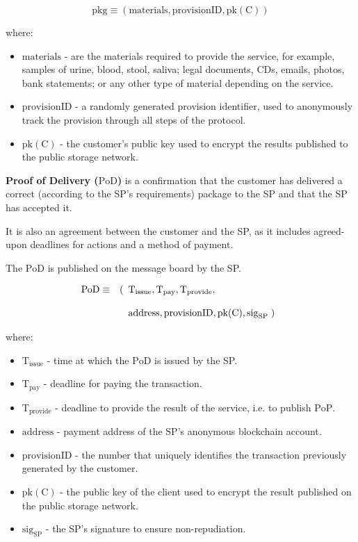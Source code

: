 \documentclass[pdftex,twocolumn,epjc3]{svjour3}
\begin{document}
{$$\mathrm{pkg} \equiv (\mathrm{materials}, \mathrm{provisionID}, \mathrm{pk(C)})$$

where:

\begin{itemize}

\item $\mathrm{materials}$ - are the materials required to provide the service, for example, samples of urine, blood, stool, saliva; legal documents, CDs, emails, photos, bank statements; or any other type of material depending on the service.
\item $\mathrm{provisionID}$ - a randomly generated provision identifier, used to anonymously track the provision through all steps of the protocol.
\item $\mathrm{pk(C)}$ - the customer's public key used to encrypt the results published to the public storage network.
\end{itemize}

\noindent \textbf
{Proof of Delivery ($\mathrm{PoD}$)}\label{proof-of-delivery} is a confirmation that the customer has delivered a correct (according to the SP's requirements) package to the SP and that the SP has accepted it.

It is also an agreement between the customer and the SP, as it includes agreed-upon deadlines for actions and a method of payment.

The $\mathrm{PoD}$ is published on the message board by the SP.

\begin{eqnarray}
\mathrm{PoD} & \equiv & (\begin{array}[t]{l}\mathrm{T}_\mathrm{issue}, \mathrm{T}_\mathrm{pay}, \mathrm{T}_\mathrm{provide}, \\\\ \mathrm{address}, \mathrm{provisionID}, \mathrm{pk(C)}, \mathrm{sig}_\mathrm{SP} \; )\end{array}
\end{eqnarray}

where:

\begin{itemize}

\item $\mathrm{T}_\mathrm{issue}$ - time at which the $\mathrm{PoD}$ is issued by the SP.
\item
  $\mathrm{T}_\mathrm{pay}$ - deadline for paying the transaction.
\item
  $\mathrm{T}_\mathrm{provide}$ - deadline to provide the result of the service, i.e. to publish $\mathrm{PoP}$.
\item $\mathrm{address}$ - payment address of the SP's anonymous blockchain account.
\item $\mathrm{provisionID}$ - the number that uniquely identifies the transaction previously generated by the customer.
\item $\mathrm{pk(C)}$ - the public key of the client used to encrypt the result published on the public storage network.
\item $\mathrm{sig}_\mathrm{SP}$ - the SP's signature to ensure non-repudiation.
\end{itemize}

}
\end{document}

